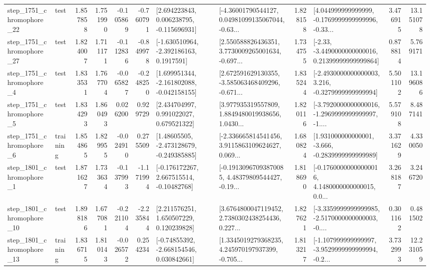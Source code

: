 \begin{tabular}{llrrrrllrlrr}
 step\_1751\_chromophore\_22 &      test &      1.857858 &    1.751990 &     -0.105869 & -0.760791 &    [2.694223843, 0.006238795, -0.115696931] &  [-4.36001790544127, 0.04981099135067044, -0.63... &       1.828158 &  [4.044999999999999, -0.1769999999999996, -0.33... &            3.476915 &         13.151078 \\
 step\_1751\_chromophore\_27 &      test &      1.824007 &    1.711171 &     -0.112836 & -0.849978 &     [-1.630510964, -2.392186163, 0.1917591] &  [2.550588826436351, 3.7730009265001634, -0.697... &       1.734755 &  [-2.33, -3.4490000000000016, 0.21399999999999864] &            0.878814 &          5.769171 \\
  step\_1751\_chromophore\_4 &      test &      1.833531 &    1.767704 &     -0.065827 & -0.248250 &   [1.699951344, -2.161802088, -0.042158155] &  [2.672591629130355, -3.585063468409296, -0.671... &       1.835244 &  [-2.4930000000000003, 3.216, -0.3279999999999994] &            5.501102 &         13.196086 \\
  step\_1751\_chromophore\_5 &      test &      1.834293 &    1.860493 &      0.026200 &  0.929729 &     [2.434704997, 0.991022027, 0.679521322] &  [3.977935319557809, 1.8849480019938656, 1.0430... &       1.820116 &  [-3.7920000000000016, -1.2969999999999997, -1.... &            5.579108 &          8.487141 \\
  step\_1751\_chromophore\_6 &  training &      1.854865 &    1.829955 &     -0.024910 &  0.275509 &    [1.48605505, -2.473128679, -0.249385885] &  [-2.336665814541456, 3.9115863109624627, 0.069... &       1.680824 &   [1.931000000000001, -3.666, -0.2839999999999989] &            3.371629 &          4.330050 \\
  step\_1801\_chromophore\_1 &      test &      1.871627 &    1.733634 &     -0.137993 & -1.171994 &    [-0.176172267, 2.667515514, -0.10482768] &  [-0.19130967093870085, 4.48379809544427, -0.19... &       1.818690 &  [-0.17600000000000016, 4.1480000000000015, 0.0... &            3.268187 &          3.246720 \\
 step\_1801\_chromophore\_10 &      test &      1.898186 &    1.677081 &     -0.221104 & -2.235844 &     [2.211576251, 1.650507229, 0.120239828] &  [3.6764800047119452, 2.7380302438254436, 0.227... &       1.827621 &  [-3.3359999999999985, -2.5170000000000003, -0.... &            0.301162 &          0.481502 \\
 step\_1801\_chromophore\_13 &  training &      1.836715 &    1.810143 &     -0.026572 &  0.254234 &    [-0.74855392, -2.668154546, 0.030842661] &  [1.3345019279368235, 4.245970197937399, -0.705... &       1.813217 &  [-1.107999999999997, -3.9529999999999994, -0.2... &            3.732993 &         12.231059 \\

\end{tabular}
